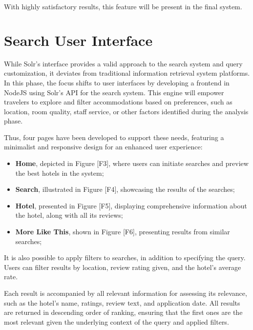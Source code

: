 \documentclass[sigconf]{acmart}
\begin{document}
With highly satisfactory results, this feature will be present in the final system.

\section{Search User Interface}

While Solr's interface provides a valid approach to the search system and query customization, it deviates from traditional information retrieval system platforms. In this phase, the focus shifts to user interfaces by developing a frontend in NodeJS \cite{NodeJS} using Solr's API \cite{Solr_api} for the search system. This engine will empower travelers to explore and filter accommodations based on preferences, such as location, room quality, staff service, or other factors identified during the analysis phase.

Thus, four pages have been developed to support these needs, featuring a minimalist and responsive design for an enhanced user experience:

\begin{itemize}
    \item \textbf{Home}, depicted in Figure [F3], where users can initiate searches and preview the best hotels in the system;
    \item \textbf{Search}, illustrated in Figure [F4], showcasing the results of the searches;
    \item \textbf{Hotel}, presented in Figure [F5], displaying comprehensive information about the hotel, along with all its reviews;
    \item \textbf{More Like This}, shown in Figure [F6], presenting results from similar searches;
\end{itemize}

It is also possible to apply filters to searches, in addition to specifying the query. Users can filter results by location, review rating given, and the hotel's average rate.

Each result is accompanied by all relevant information for assessing its relevance, such as the hotel's name, ratings, review text, and application date. All results are returned in descending order of ranking, ensuring that the first ones are the most relevant given the underlying context of the query and applied filters.







\nocite{*}
\def\BibTex{BibTeX}


\appendix
\end{document}
